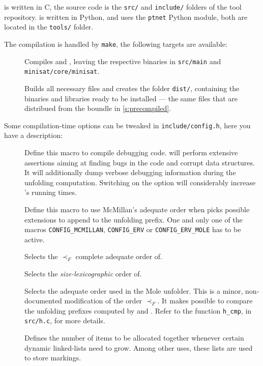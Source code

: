 \documentclass[a4paper]{refart}
\begin{document}
\cunf is written in C, the source code is the \verb!src/! and
\verb!include/! folders of the tool repository. \cna is
written in Python, and uses the \verb!ptnet! Python module,
both are located in the \verb!tools/! folder.

The compilation is handled by \verb!make!, the following targets are available:
\begin{description}
\item[]
  Compiles \cunf and \minisat, leaving the respective binaries in
  \verb!src/main! and \verb!minisat/core/minisat!.
\item[]
  Builds all necessary files and creates the folder \verb!dist/!, containing
  the binaries and libraries ready to be installed --- the same files that are
  distribued from the boundle in \cref{s:precompiled}.
\end{description}

Some compilation-time options can be tweaked in \verb!include/config.h!, here
you have a description:

\begin{description}
\item[]  Define this macro to compile debugging code.
\cunf will perform extensive assertions aiming at finding bugs in the code and
corrupt data structures.  It will additionally dump verbose debugging
information during the unfolding computation.  Switching on the option will
considerably increase \cunf's running times.

\item[]  Define this macro to use McMillan's adequate
order\cite{MM95} when \cunf picks possible extensions to append to the
unfolding prefix.  One and only one of the macros \verb!CONFIG_MCMILLAN!,
\verb!CONFIG_ERV! or \verb!CONFIG_ERV_MOLE! has to be active.

\item[]  Selects the $\prec_F$ complete adequate order
of\cite{ERV02}.

\item[]  Selects the \emph{size-lexicographic} order
of\cite[definition 4.51]{EH08}.

\item[]  Selects the adequate order used in the Mole
unfolder\cite{Mole}.  This is a minor, non-documented modification of
the order $\prec_F$.  It makes possible to compare the unfolding prefixes
computed by \cunf and \mole.  Refer to the function \verb!h_cmp!, in
\verb!src/h.c!, for more details.

\item[]  Defines the number of items to be
allocated together whenever certain dynamic linked-lists need to grow.  Among
other uses, these lists are used to store markings.

\end{description}
\end{document}
